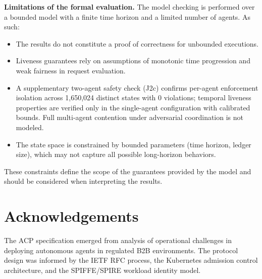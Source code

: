 \documentclass[11pt]{article}
\theoremstyle{definition}
\begin{document}
\noindent\textbf{Limitations of the formal evaluation.}
The model checking is performed over a bounded model with a finite time horizon
and a limited number of agents.
As such:
\begin{itemize}[noitemsep]
  \item The results do not constitute a proof of correctness for unbounded executions.
  \item Liveness guarantees rely on assumptions of monotonic time progression and weak
        fairness in request evaluation.
  \item A supplementary two-agent safety check (J2c) confirms per-agent enforcement
        isolation across 1,650,024 distinct states with 0 violations; temporal liveness
        properties are verified only in the single-agent configuration with calibrated
        bounds. Full multi-agent contention under adversarial coordination is not modeled.
  \item The state space is constrained by bounded parameters (time horizon, ledger size),
        which may not capture all possible long-horizon behaviors.
\end{itemize}
These constraints define the scope of the guarantees provided by the model and should
be considered when interpreting the results.

\section*{Acknowledgements}

The ACP specification emerged from analysis of operational challenges in deploying autonomous agents in regulated B2B environments.
The protocol design was informed by the IETF RFC process, the Kubernetes admission control architecture,
and the SPIFFE/SPIRE workload identity model.




\end{document}
